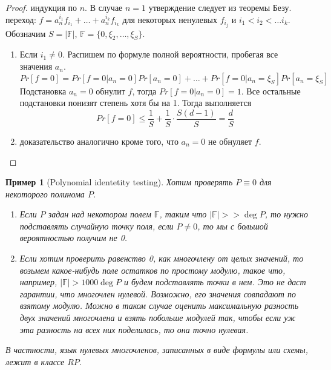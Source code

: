 \documentclass[12pt, letterpaper]{article}
\newtheorem{sample}{Пример}[section]
\newcommand{\Ff}{\mathbb{F}}
\begin{document}
\begin{proof}
индукция по $n$. В случае $n=1$ утверждение следует из теоремы Безу.\\
переход: $f = a_n^{i_1} f_{i_1} + \ldots + a_n^{i_k} f_{i_k}$ для некоторых ненулевых $f_{i_j}$ и $i_1 < i_2 < \ldots i_k$.\\
Обозначим $S = |\Ff|$, $\Ff = \{0, \xi_2, \ldots, \xi_{S} \}$. 
\begin{enumerate}
\item Если $i_1 \neq 0$. Распишем по формуле полной вероятности, пробегая все значения $a_n$.\\
$$Pr[f=0] = Pr[f=0|a_n=0]Pr[a_n=0] + \ldots + Pr[f=0|a_n=\xi_{S}]Pr[a_n=\xi_{S}] $$
Подстановка $a_n=0$ обнулит $f$, тогда $Pr[f=0|a_n=0] = 1$. Все остальные подстановки понизят степень хотя бы на 1. Тогда выполняется $$
Pr[f=0] \leq \frac{1}{S} + \frac{1}{S} \cdot \frac{S(d-1)}{S} = \frac{d}{S} 
$$
\item доказательство аналогично кроме того, что $a_n=0$ не обнуляет $f$.
\end{enumerate}
\end{proof}

\begin{sample}[Polynomial identetity testing]
Хотим проверять $P \equiv 0$ для некоторого полинома $P$.
\begin{enumerate}
\item Если $P$ задан над некотором полем $\Ff$, таким что $|\Ff| >> \deg P$, то нужно подставлять случайную точку поля, если $P \neq 0$, то мы с большой вероятностью получим не 0.
\item Если хотим проверить равенство 0, как многочлену от целых значений, то возьмем какое-нибудь поле остатков по простому модулю, такое что, например, $|\Ff| > 1000 \deg P$ и будем подставлять точки в нем. Это не даст гарантии, что многочлен нулевой. Возможно, его значения совпадают по взятому модулю. Можно в таком случае оценить максимальную разность двух значений многочлена и взять побольше модулей так, чтобы если уж эта разность на всех них поделилась, то она точно нулевая.
\end{enumerate}
В частности, язык нулевых многочленов, записанных в виде формулы или схемы, лежит в классе $RP$.
\end{sample}
\end{document}
